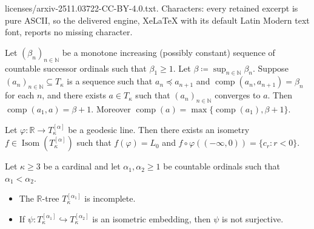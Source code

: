 \documentclass[10pt,a4paper]{amsart}
\DeclareMathOperator{\Isom}{Isom}
\DeclareMathOperator{\comp}{comp}
\begin{document}
licenses/arxiv-2511.03722-CC-BY-4.0.txt. Characters: every retained excerpt is pure ASCII, so the delivered engine, XeLaTeX with its default Latin Modern text font, reports no missing character.
\begin{lemma} \label{lem: complexity of the limit}
    Let $(\beta_n)_{n \in \mathbb{N}}$ be a monotone increasing (possibly constant) sequence of countable successor ordinals such that $\beta_1 \geq 1$. Let $\beta \coloneqq \sup_{n \in \mathbb{N}} \beta_n$. Suppose $(a_n)_{n \in \mathbb{N}} \subseteq T_\kappa$ is a sequence such that $a_n \preceq a_{n+1}$ and $\comp(a_n, a_{n+1}) = \beta_n$ for each $n$, and there exists $a \in T_\kappa$ such that $(a_n)_{n \in \mathbb{N}}$ converges to $a$. Then $\comp(a_1,a) = \beta + 1$. Moreover $\comp(a) = \max\{\comp(a_1), \beta + 1\}$.
\end{lemma}

\begin{lemma} \label{lem: order preserving isom}
    Let $\varphi: \mathbb{R} \rightarrow T_\kappa^{[\alpha]}$ be a geodesic line. Then there exists an isometry $f \in \Isom(T_\kappa^{[\alpha]})$ such that $f(\varphi) = L_0$ and $f \circ \varphi((-\infty,0)) = \{c_r : r < 0\}$.
\end{lemma}

\begin{proposition} \label{lem: no isometry}
    Let $\kappa \geq 3$ be a cardinal and let $\alpha_1, \alpha_2 \geq 1$ be countable ordinals such that $\alpha_1 < \alpha_2$.
    \begin{itemize} 
    	\item The $\mathbb{R}$-tree $T_\kappa^{[\alpha_1]}$ is incomplete.
    	\item If $\psi: T_\kappa^{[\alpha_1]} \hookrightarrow T_\kappa^{[\alpha_2]}$ is an isometric embedding, then $\psi$ is not surjective.
    \end{itemize}
\end{proposition}
\end{document}
